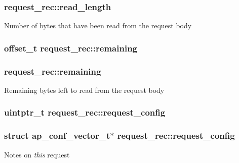 \subsubsection[{\texorpdfstring{read\+\_\+length}{read_length}}]{ request\+\_\+rec\+::read\+\_\+length}\hypertarget{structrequest__rec_acfbce388a8423071691689f34a894f9b}{}\label{structrequest__rec_acfbce388a8423071691689f34a894f9b}
Number of bytes that have been read from the request body 
\subsubsection[{\texorpdfstring{remaining}{remaining}}]{\setlength{\rightskip}{0pt plus 5cm}offset\+\_\+t request\+\_\+rec\+::remaining}\hypertarget{structrequest__rec_ae76abf0f18b4876bc014a74239319811}{}\label{structrequest__rec_ae76abf0f18b4876bc014a74239319811}
\subsubsection[{\texorpdfstring{remaining}{remaining}}]{ request\+\_\+rec\+::remaining}\hypertarget{structrequest__rec_a743212601ea2d2d9e202fbbac6867360}{}\label{structrequest__rec_a743212601ea2d2d9e202fbbac6867360}
Remaining bytes left to read from the request body 
\subsubsection[{\texorpdfstring{request\+\_\+config}{request_config}}]{\setlength{\rightskip}{0pt plus 5cm}uintptr\+\_\+t request\+\_\+rec\+::request\+\_\+config}\hypertarget{structrequest__rec_a64ddc7e883db1473c43254766c0c0c07}{}\label{structrequest__rec_a64ddc7e883db1473c43254766c0c0c07}
\subsubsection[{\texorpdfstring{request\+\_\+config}{request_config}}]{\setlength{\rightskip}{0pt plus 5cm}struct {\bf ap\+\_\+conf\+\_\+vector\+\_\+t}$\ast$ request\+\_\+rec\+::request\+\_\+config}\hypertarget{structrequest__rec_ab3a381ecca6222a21777e53d0c5a0a14}{}\label{structrequest__rec_ab3a381ecca6222a21777e53d0c5a0a14}
Notes on {\itshape this} request 
